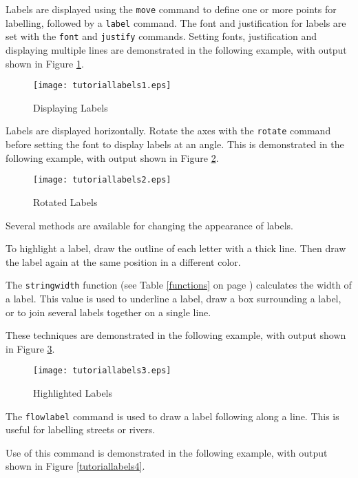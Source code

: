 Labels are displayed using the \texttt{move}
command to define one or more points for labelling, followed by a
\texttt{label} command.  The font and justification for labels
are set with the \texttt{font} and \texttt{justify} commands.
Setting fonts, justification and displaying multiple lines
are demonstrated in the following example, with output
shown in Figure \ref{tutoriallabels1}.



\begin{figure}[htb]
\texttt{[image: tutoriallabels1.eps]}
\caption{Displaying Labels}
\label{tutoriallabels1}
\end{figure}

Labels are displayed horizontally.  Rotate the axes with the \texttt{rotate}
command before setting the font to display labels at an angle.
This is demonstrated in the following example,
with output shown in Figure \ref{tutoriallabels2}.



\begin{figure}[htb]
\texttt{[image: tutoriallabels2.eps]}
\caption{Rotated Labels}
\label{tutoriallabels2}
\end{figure}

Several methods are available for changing the appearance of labels.

To highlight a label, draw the outline of each letter with a thick line.
Then draw the label again at the same position in a different color.

The \texttt{stringwidth} function (see Table \ref{functions}
on page \pageref{functions}) calculates the
width of a label.  This value is used to underline a label, draw a box
surrounding a label, or to join several labels together on a single line.

These techniques are demonstrated in the following example,
with output shown in Figure \ref{tutoriallabels3}.



\begin{figure}[htb]
\texttt{[image: tutoriallabels3.eps]}
\caption{Highlighted Labels}
\label{tutoriallabels3}
\end{figure}

The \texttt{flowlabel} command is used to draw a label
following along a line.  This is useful for labelling streets or
rivers.

Use of this command is demonstrated in the following example,
with output shown in Figure \ref{tutoriallabels4}.

